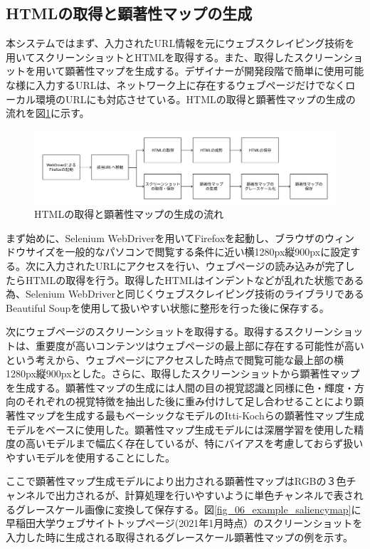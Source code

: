 \subsection{HTMLの取得と顕著性マップの生成}\label{subsec:system01}
\par 本システムではまず、入力されたURL情報を元にウェブスクレイピング技術を用いてスクリーンショットとHTMLを取得する。また、取得したスクリーンショットを用いて顕著性マップを生成する。デザイナーが開発段階で簡単に使用可能な様に入力するURLは、ネットワーク上に存在するウェブページだけでなくローカル環境のURLにも対応させている。HTMLの取得と顕著性マップの生成の流れを図\ref{fig_system01}に示す。

\begin{figure}[H]
    \centering
    \includegraphics[width=12cm]{figures/06_process01.jpg}
    \caption{HTMLの取得と顕著性マップの生成の流れ}
    \label{fig_system01}
\end{figure}

\par まず始めに、Selenium WebDriverを用いてFirefoxを起動し、ブラウザのウィンドウサイズを一般的なパソコンで閲覧する条件に近い横1280px縦900pxに設定する。次に入力されたURLにアクセスを行い、ウェブページの読み込みが完了したらHTMLの取得を行う。取得したHTMLはインデントなどが乱れた状態である為、Selenium WebDriverと同じくウェブスクレイピング技術のライブラリであるBeautiful Soup\cite{beautifulsoup}を使用して扱いやすい状態に整形を行った後に保存する。

\par 次にウェブページのスクリーンショットを取得する。取得するスクリーンショットは、重要度が高いコンテンツはウェブページの最上部に存在する可能性が高いという考えから、ウェブページにアクセスした時点で閲覧可能な最上部の横1280px縦900pxとした。さらに、取得したスクリーンショットから顕著性マップを生成する。顕著性マップの生成には人間の目の視覚認識と同様に色・輝度・方向のそれぞれの視覚特徴を抽出した後に重み付けして足し合わせることにより顕著性マップを生成する最もベーシックなモデルのItti-Kochらの顕著性マップ生成モデルをベースに使用した。顕著性マップ生成モデルには深層学習を使用した精度の高いモデルまで幅広く存在しているが、特にバイアスを考慮しておらず扱いやすいモデルを使用することにした。
\par ここで顕著性マップ生成モデルにより出力される顕著性マップはRGBの３色チャンネルで出力されるが、計算処理を行いやすいように単色チャンネルで表されるグレースケール画像に変換して保存する。図\ref{fig_06_example_saliencymap}に早稲田大学ウェブサイトトップページ(2021年1月時点）\cite{waseda_top}のスクリーンショットを入力した時に生成される取得されるグレースケール顕著性マップの例を示す。

